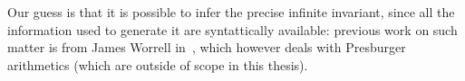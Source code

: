 Our guess is that it is possible to infer the precise infinite
invariant, since all the information used to generate it are
syntattically available: previous work on such matter is from James
Worrell in~\cite{Lefaucheux2024}, which however deals with Presburger
arithmetics (which are outside of scope in this thesis).






